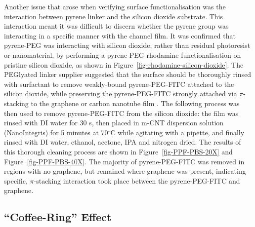 \documentclass[
  a4paper,
]{scrbook}
\begin{document}
Another issue that arose when verifying surface functionalisation was
the interaction between pyrene linker and the silicon dioxide substrate.
This interaction meant it was difficult to discern whether the pyrene
group was interacting in a specific manner with the channel film. It was
confirmed that pyrene-PEG was interacting with silicon dioxide, rather
than residual photoresist or nanomaterial, by performing a
pyrene-PEG-rhodamine functionalisation on pristine silicon dioxide, as
shown in Figure~\ref{fig-rhodamine-silicon-dioxide}. The PEGlyated
linker supplier suggested that the surface should be thoroughly rinsed
with surfactant to remove weakly-bound pyrene-PEG-FITC attached to the
silicon dioxide, while preserving the pyrene-PEG-FITC strongly attached
via \(\pi\)-stacking to the graphene or carbon nanotube film
\autocite{CreativePEGworks2022}. The following process was then used to
remove pyrene-PEG-FITC from the silicon dioxide: the film was rinsed
with DI water for 30 s, then placed in m-CNT dispersion solution
(NanoIntegris) for 5 minutes at 70\(^\circ\)C while agitating with a
pipette, and finally rinsed with DI water, ethanol, acetone, IPA and
nitrogen dried. The results of this thorough cleaning process are shown
in Figure~\ref{fig-PPF-PBS-20X} and Figure~\ref{fig-PPF-PBS-40X}. The
majority of pyrene-PEG-FITC was removed in regions with no graphene, but
remained where graphene was present, indicating specific,
\(\pi\)-stacking interaction took place between the pyrene-PEG-FITC and
graphene.

\hypertarget{sec-coffee-ring}{%
\subsection{``Coffee-Ring'' Effect}\label{sec-coffee-ring}}
\end{document}
